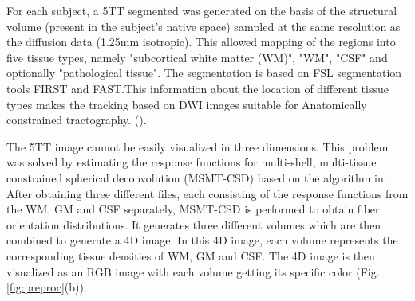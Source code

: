 \documentclass[msthesis.tex]{subfiles}
\begin{document}
For each subject, a 5TT segmented was generated on the basis of the structural volume (present in the subject's native space) sampled at the same resolution as the diffusion data (1.25mm isotropic). This allowed mapping of the regions into five tissue types, namely "subcortical white matter (WM)", "WM", "CSF" and optionally "pathological tissue". The segmentation is based on FSL segmentation tools FIRST and FAST.This information about the location of different tissue types makes the tracking based on DWI images suitable for Anatomically constrained tractography.  (\cite{anattractsmith}).

The 5TT image cannot be easily visualized in three dimensions. This problem was solved by estimating the response functions for multi-shell, multi-tissue constrained spherical deconvolution (MSMT-CSD)  based on the algorithm in \cite{jeurissen2014multi}. After obtaining three different files, each consisting of the response functions from the WM, GM and CSF separately, MSMT-CSD is performed to obtain fiber orientation distributions. It generates three different volumes which are then combined to generate a 4D image. In this 4D image, each volume represents the corresponding tissue densities of WM, GM and CSF. The 4D image is then visualized as an RGB image with each volume getting its specific color (Fig. \ref{fig:preproc}(b)). 

\end{document}
